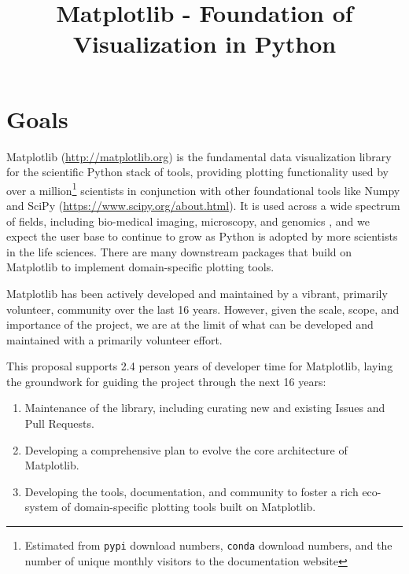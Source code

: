 \documentclass[11pt]{article}  %
\begin{document}
\title{Matplotlib - Foundation of Visualization in Python}
\author{}
\maketitle

\section{Goals}

Matplotlib (\url{http://matplotlib.org}) is the fundamental data
visualization library for the scientific Python stack of tools,
providing plotting functionality used by over a million\footnote{Estimated
from \texttt{pypi} download numbers, \texttt{conda} download numbers,
and the number of unique monthly visitors to the documentation
website} scientists in conjunction with other foundational tools like
Numpy and SciPy (\url{https://www.scipy.org/about.html}).  It is used
across a wide spectrum of fields, including bio-medical imaging,
microscopy, and genomics
\cite{Carpenter2006,Wolf2018,10.7717/peerj.453}
\cite{Segata2011,10.1371/journal.pgen.1000695,HASHIMSHONY2012666,
  10.1093/bioinformatics/bts480,Carlile2014,Laganowsky2014,Jiangaac9462,
  10.3389/fninf.2014.00014}, and we expect the user base to continue
to grow as Python is adopted by more scientists in the life
sciences. There are many downstream packages that build on Matplotlib
to implement domain-specific plotting tools.

Matplotlib has been actively developed and maintained by a vibrant,
primarily volunteer, community over the last 16 years.  However, given
the scale, scope, and importance of the project, we are at the limit
of what can be developed and maintained with a primarily volunteer
effort.

This proposal supports 2.4 person years of developer time for
Matplotlib, laying the groundwork for guiding
the project through the next 16 years:

\begin{enumerate}[label=\alph*),noitemsep]
  \item Maintenance of the library, including curating new and
    existing Issues and Pull Requests.
  \item Developing a comprehensive plan to evolve the core architecture
    of Matplotlib.
  \item Developing the tools, documentation, and community to foster a
    rich eco-system of domain-specific plotting tools built on
    Matplotlib.
\end{enumerate}
\end{document}
